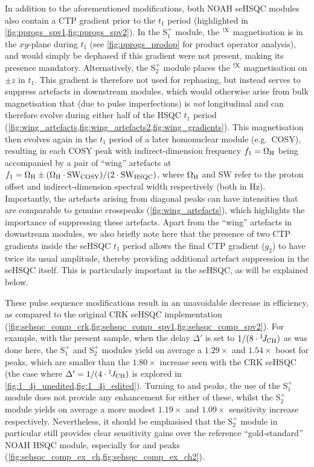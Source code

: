 \documentclass[11pt]{article}
\newcommand*{\noahSpa}{S$^+_1$}
\newcommand*{\noahSpb}{S$^+_2$}
\newcommand*{\nitrogen}{\ce{^{15}N}}
\newcommand*{\onejch}{{}^{1}\!J_{\ce{CH}}}
\newcommand*{\magnnot}[1]{\ce{^1H}$^{!#1}$}
\begin{document}
\begin{refsection}
In addition to the aforementioned modifications, both NOAH seHSQC modules also contain a CTP gradient prior to the $t_1$ period (highlighted in \cref{fig:pprogs_spv1,fig:pprogs_spv2}).
In the \noahSpa{} module, the \magnnot{\ce{X}} magnetisation is in the $xy$-plane during $t_1$ (see \cref{fig:pprogs_prodop} for product operator analysis), and would simply be dephased if this gradient were not present, making its presence mandatory.
Alternatively, the \noahSpb{} module places the \magnnot{\ce{X}} magnetisation on $\pm z$ in $t_1$.
This gradient is therefore not used for rephasing, but instead serves to suppress artefacts in downstream modules, which would otherwise arise from bulk magnetisation that (due to pulse imperfections) is \textit{not} longitudinal and can therefore evolve during either half of the HSQC $t_1$ period (\cref{fig:wing_artefacts,fig:wing_artefacts2,fig:wing_gradients}).
This magnetisation then evolves again in the $t_1$ period of a later homonuclear module (e.g.\ COSY), resulting in each COSY peak with indirect-dimension frequency $f_1 = \Omega_{\ce{H}}$ being accompanied by a pair of ``wing'' artefacts at $f_1 = \Omega_{\ce{H}} \pm (\Omega_{\ce{H}}\cdot\mathrm{SW_{COSY}})/(2\cdot \mathrm{SW_{HSQC}})$, where $\Omega_{\ce{H}}$ and SW refer to the proton offset and indirect-dimension spectral width respectively (both in Hz).
Importantly, the artefacts arising from diagonal peaks can have intensities that are comparable to genuine crosspeaks (\cref{fig:wing_artefacts}), which highlights the importance of suppressing these artefacts.
Apart from the ``wing'' artefacts in downstream modules, we also briefly note here that the presence of two CTP gradients inside the seHSQC $t_1$ period allows the final CTP gradient ($g_2$) to have twice its usual amplitude, thereby providing additional artefact suppression in the seHSQC itself.
This is particularly important in the \nitrogen{} seHSQC, as will be explained below.

These pulse sequence modifications result in an unavoidable decrease in efficiency, as compared to the original CRK seHSQC implementation (\cref{fig:sehsqc_comp_crk,fig:sehsqc_comp_spv1,fig:sehsqc_comp_spv2}).
For example, with the present sample, when the delay $\Delta'$ is set to $1/(8\cdot\onejch)$ as was done here,\autocite{Schleucher1994JBNMR} the \noahSpa{} and \noahSpb{} modules yield on average a $1.29\times$ and $1.54\times$ boost for  peaks, which are smaller than the $1.80\times$ increase seen with the CRK seHSQC (the case where $\Delta' = 1/(4\cdot\onejch)$ is explored in \cref{fig:1_4j_unedited,fig:1_4j_edited}).
Turning to  and  peaks, the use of the \noahSpa{} module does not provide any enhancement for either of these, whilst the \noahSpb{} module yields on average a more modest $1.19\times$ and $1.09\times$ sensitivity increase respectively.
Nevertheless, it should be emphasised that the \noahSpb{} module in particular still provides clear sensitivity gains over the reference ``gold-standard'' NOAH HSQC module, especially for  and  peaks (\cref{fig:sehsqc_comp_ex_ch,fig:sehsqc_comp_ex_ch2}).


\end{refsection}
\end{document}
